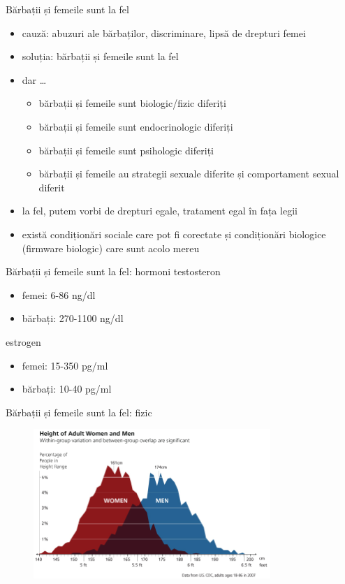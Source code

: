 \documentclass{simple}
\begin{document}
\begin{frame}{Bărbații și femeile sunt la fel}
  \begin{itemize}
    \pause \item cauză: abuzuri ale bărbaților, discriminare, lipsă de drepturi femei
    \pause \item soluția: bărbații și femeile sunt la fel
    \pause \item dar \ldots
      \begin{itemize}
        \pause \item bărbații și femeile sunt biologic/fizic diferiți
        \pause \item bărbații și femeile sunt endocrinologic diferiți
        \pause \item bărbații și femeile sunt psihologic diferiți
        \pause \item bărbații și femeile au strategii sexuale diferite și comportament sexual diferit
      \end{itemize}
    \pause \item la fel, putem vorbi de drepturi egale, tratament egal în fața legii
    \pause \item există condiționări sociale care pot fi corectate și condiționări biologice (firmware biologic) care sunt acolo mereu
  \end{itemize}
\end{frame}

\begin{frame}{Bărbații și femeile sunt la fel: hormoni}
  \pause testosteron \\
  \begin{itemize}
    \pause \item femei: 6-86 ng/dl
    \pause \item bărbați: 270-1100 ng/dl
  \end{itemize}
  \pause estrogen \\
  \begin{itemize}
    \pause \item femei: 15-350 pg/ml
    \pause \item bărbați: 10-40 pg/ml
  \end{itemize}
\end{frame}

\begin{frame}{Bărbații și femeile sunt la fel: fizic}
  \centering
  \begin{figure}
    \includegraphics[width=0.8\textwidth]{img/male-female-height}
  \end{figure}
\end{frame}
\end{document}

